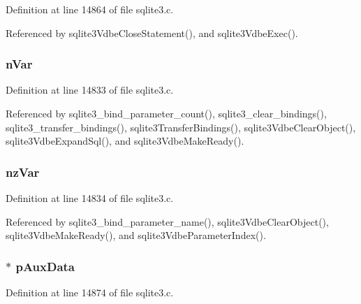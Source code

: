 Definition at line 14864 of file sqlite3.\+c.



Referenced by sqlite3\+Vdbe\+Close\+Statement(), and sqlite3\+Vdbe\+Exec().

\hypertarget{struct_vdbe_a8ddc3d06e7916f0973e7f5c80087d086}{}
\subsubsection[{n\+Var}]{ n\+Var}\label{struct_vdbe_a8ddc3d06e7916f0973e7f5c80087d086}


Definition at line 14833 of file sqlite3.\+c.



Referenced by sqlite3\+\_\+bind\+\_\+parameter\+\_\+count(), sqlite3\+\_\+clear\+\_\+bindings(), sqlite3\+\_\+transfer\+\_\+bindings(), sqlite3\+Transfer\+Bindings(), sqlite3\+Vdbe\+Clear\+Object(), sqlite3\+Vdbe\+Expand\+Sql(), and sqlite3\+Vdbe\+Make\+Ready().

\hypertarget{struct_vdbe_a11f25595e47d582f06efd3a1dab36958}{}
\subsubsection[{nz\+Var}]{ nz\+Var}\label{struct_vdbe_a11f25595e47d582f06efd3a1dab36958}


Definition at line 14834 of file sqlite3.\+c.



Referenced by sqlite3\+\_\+bind\+\_\+parameter\+\_\+name(), sqlite3\+Vdbe\+Clear\+Object(), sqlite3\+Vdbe\+Make\+Ready(), and sqlite3\+Vdbe\+Parameter\+Index().

\hypertarget{struct_vdbe_ad920703177335416d57ee0f5988a928a}{}
\subsubsection[{p\+Aux\+Data}]{$\ast$ p\+Aux\+Data}\label{struct_vdbe_ad920703177335416d57ee0f5988a928a}


Definition at line 14874 of file sqlite3.\+c.




